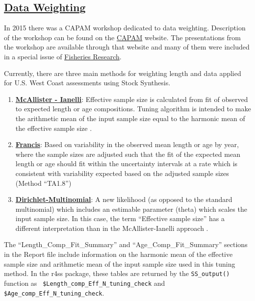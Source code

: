 \hypertarget{DataWeight}{}
\subsection[Data Weighting]{\protect\hyperlink{DataWeight}{Data Weighting}}\label{sec:DataWeight}


In 2015 there was a CAPAM workshop dedicated to data weighting. Description of the workshop can be found on the \href{http://capamresearch.org/data-weighting/workshop}{CAPAM} website. The presentations from the workshop are available through that website and many of them were included in a special issue of \href{https://sciencedirect.com/journal/fisheries-research/vol/192}{Fisheries Research}.

Currently, there are three main methods for weighting length and data applied for U.S. West Coast assessments using Stock Synthesis.

\begin{enumerate}
	\item \hyperlink{MI}{\textbf{McAllister - Ianelli}}: Effective sample size is calculated from fit of observed to expected length or age compositions. Tuning algorithm is intended to make the arithmetic mean of the input sample size equal to the harmonic mean of the effective sample size \citep{mcallister-bayesian-1997}.
	
	\item \hyperlink{Francis}{\textbf{Francis}}: Based on variability in the observed mean length or age by year, where the sample sizes are adjusted such that the fit of the expected mean length or age should fit within the uncertainty intervals at a rate which is consistent with variability expected based on the adjusted sample sizes (Method ``TA1.8'') \citep{francis-data-2011}
	
	\item \hyperlink{DM}{\textbf{Dirichlet-Multinomial}}: A new likelihood (as opposed to the standard multinomial) which includes an estimable parameter (theta) which scales the input sample size. In this case, the term ``Effective sample size'' has a different interpretation than in the McAllister-Ianelli approach \citep{thorson-model-based-2017}.
\end{enumerate}


\hypertarget{MI}{}
The ``Length\_Comp\_Fit\_Summary'' and ``Age\_Comp\_Fit\_Summary'' sections in the Report file include information on the harmonic mean of the effective sample size and arithmetic mean of the input sample size used in this tuning method. In the r4ss package, these tables are returned by the \texttt{SS\_output()} function as \texttt{ \$Length\_comp\_Eff\_N\_tuning\_check} and \texttt{ \$Age\_comp\_Eff\_N\_tuning\_check}.

